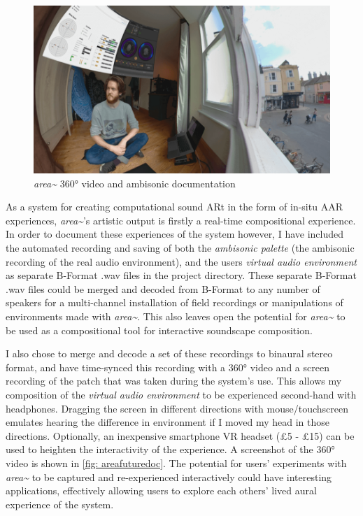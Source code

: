 \begin{figure}
    \centering
    \includegraphics{figures/05-area/areafuturedoc.png}
    \caption{\textit{area\textasciitilde{}} 360° video and ambisonic documentation \citep[from][]{bilbow2020a}}
    \label{fig: areafuturedoc}
\end{figure}
As a system for creating computational sound ARt in the form of in-situ AAR experiences, \textit{area\textasciitilde{}}'s artistic output is firstly a real-time compositional experience. In order to document these experiences of the system however, I have included the automated recording and saving of both the \textit{ambisonic palette} (the ambisonic recording of the real audio environment), and the users \textit{virtual audio environment} as separate B-Format .wav files in the project directory. These separate B-Format .wav files could be merged and decoded from B-Format to any number of speakers for a multi-channel installation of field recordings or manipulations of environments made with \textit{area\textasciitilde{}}. This also leaves open the potential for \textit{area\textasciitilde{}} to be used as a compositional tool for interactive soundscape composition.

I also chose to merge and decode a set of these recordings to binaural stereo format, and have time-synced this recording with a 360° video and a screen recording of the patch that was taken during the system's use. This allows my composition of the \textit{virtual audio environment} to be experienced second-hand with headphones. Dragging the screen in different directions with mouse/touchscreen emulates hearing the difference in environment if I moved my head in those directions. Optionally, an inexpensive smartphone VR headset (£5 - £15) can be used to heighten the interactivity of the experience. A screenshot of the 360° video \citep{bilbow2020} is shown in \autoref{fig: areafuturedoc}. The potential for users' experiments with \textit{area\textasciitilde{}} to be captured and re-experienced interactively could have interesting applications, effectively allowing users to explore each others' lived aural experience of the system.



